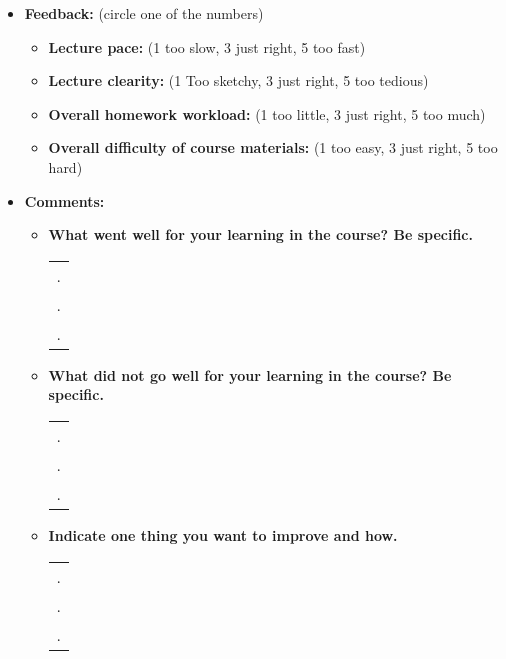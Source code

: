 \begin{itemize}
\item {\bf Feedback:} (circle one of the numbers)
\begin{itemize}

\item {\bf Lecture pace:} (1 too slow, 3 just right, 5 too fast)


\item {\bf Lecture clearity:} (1 Too sketchy, 3 just right, 5 too tedious)


\item {\bf Overall homework workload:} (1 too little, 3 just right, 5 too much)


\item {\bf Overall difficulty of course materials:} (1 too easy, 3 just right, 5 too hard)

\end{itemize} 

\item {\bf Comments:}
\begin{itemize}

\item {\bf What went well for your learning in the course? Be specific.}

\begin{tabular}{l}
.  \\
.  \\
.  \\
\end{tabular}
\vskip 5cm

\item {\bf What did not go well for your learning in the course? Be specific.}
\begin{tabular}{l}
.  \\
.  \\
.  \\
\end{tabular}
\vskip 0.9in

\item {\bf Indicate one thing you want to improve and how.}
\begin{tabular}{l}
.  \\
.  \\
.  \\
\end{tabular}
\vskip 0.9in

\end{itemize}

\end{itemize}



